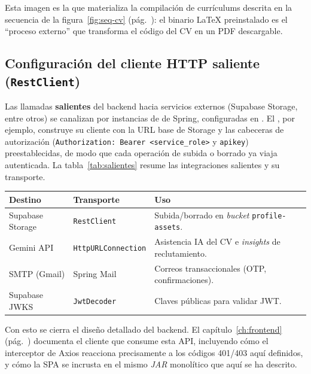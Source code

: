 Esta imagen es la que materializa la compilación de currículums descrita en la
secuencia de la figura~\ref{fig:seq-cv} (pág.~\pageref{fig:seq-cv}): el binario LaTeX
preinstalado es el ``proceso externo'' que transforma el código del CV en un PDF
descargable.

\subsection{Configuración del cliente HTTP saliente (\texttt{RestClient})}
\label{subsec:restclient}

Las llamadas \textbf{salientes} del backend hacia servicios externos (Supabase Storage,
entre otros) se canalizan por instancias de  de Spring, configuradas en
. El , por ejemplo, construye su
cliente con la URL base de Storage y las cabeceras de autorización
(\texttt{Authorization: Bearer <service\_role>} y \texttt{apikey}) preestablecidas, de modo
que cada operación de subida o borrado ya viaja autenticada. La tabla~\ref{tab:salientes}
resume las integraciones salientes y su transporte.

\vspace{0.2cm}
\noindent
\renewcommand{\arraystretch}{1.3}
\fontsize{8.5}{10.2}\selectfont\sffamily
\begin{tabularx}{\textwidth}{|L{3.4cm}|L{3.0cm}|Y|}
\hline
{}
\sffamily\textbf{Destino} & \sffamily\textbf{Transporte} & \sffamily\textbf{Uso} \\
\hline
Supabase Storage & \texttt{RestClient} & Subida/borrado en \textit{bucket} \texttt{profile-assets}. \\ \hline
{}
Gemini API & \texttt{HttpURLConnection} & Asistencia IA del CV e \textit{insights} de reclutamiento. \\ \hline
SMTP (Gmail) & Spring Mail & Correos transaccionales (OTP, confirmaciones). \\ \hline
{}
Supabase JWKS & \texttt{JwtDecoder} & Claves públicas para validar JWT. \\ \hline
\end{tabularx}
\label{tab:salientes}

\bigskip
Con esto se cierra el diseño detallado del backend. El capítulo~\ref{ch:frontend}
(pág.~\pageref{ch:frontend}) documenta el cliente que consume esta API, incluyendo cómo el
interceptor de Axios reacciona precisamente a los códigos 401/403 aquí definidos, y cómo
la SPA se incrusta en el mismo \textit{JAR} monolítico que aquí se ha descrito.
